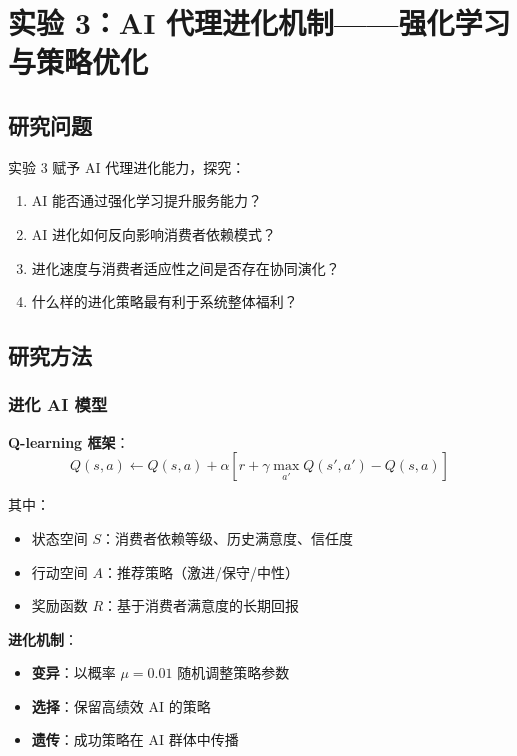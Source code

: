 \documentclass[a4paper,12pt]{article}
\begin{document}
\section{实验 3：AI 代理进化机制——强化学习与策略优化}

\subsection{研究问题}

实验 3 赋予 AI 代理进化能力，探究：
\begin{enumerate}
    \item AI 能否通过强化学习提升服务能力？
    \item AI 进化如何反向影响消费者依赖模式？
    \item 进化速度与消费者适应性之间是否存在协同演化？
    \item 什么样的进化策略最有利于系统整体福利？
\end{enumerate}

\subsection{研究方法}

\subsubsection{进化 AI 模型}

\textbf{Q-learning 框架}：
\begin{equation}
    Q(s,a) \leftarrow Q(s,a) + \alpha [r + \gamma \max_{a'} Q(s',a') - Q(s,a)]
\end{equation}

其中：
\begin{itemize}
    \item 状态空间 $S$：消费者依赖等级、历史满意度、信任度
    \item 行动空间 $A$：推荐策略（激进/保守/中性）
    \item 奖励函数 $R$：基于消费者满意度的长期回报
\end{itemize}

\textbf{进化机制}：
\begin{itemize}
    \item \textbf{变异}：以概率 $\mu=0.01$ 随机调整策略参数
    \item \textbf{选择}：保留高绩效 AI 的策略
    \item \textbf{遗传}：成功策略在 AI 群体中传播
\end{itemize}
\end{document}
